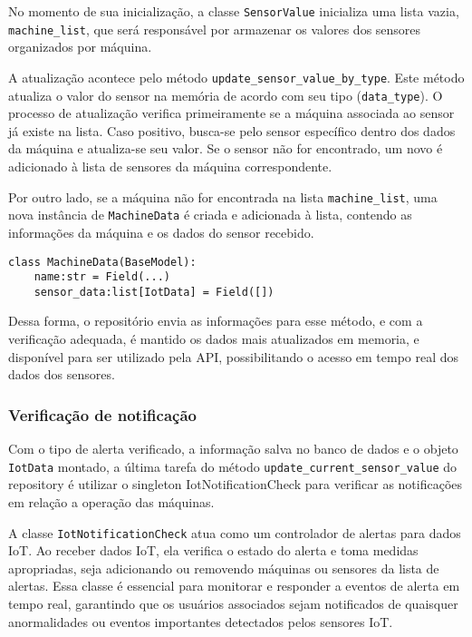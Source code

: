 No momento de sua inicialização, a classe \texttt{SensorValue} inicializa uma lista vazia, \texttt{machine\_list}, que será responsável por armazenar os valores dos sensores organizados por máquina.

A atualização acontece pelo método \texttt{update\_sensor\_value\_by\_type}. Este método atualiza o valor do sensor na memória de acordo com seu tipo (\texttt{data\_type}). O processo de atualização verifica primeiramente se a máquina associada ao sensor já existe na lista. Caso positivo, busca-se pelo sensor específico dentro dos dados da máquina e atualiza-se seu valor. Se o sensor não for encontrado, um novo é adicionado à lista de sensores da máquina correspondente.

Por outro lado, se a máquina não for encontrada na lista \texttt{machine\_list}, uma nova instância de \texttt{MachineData} é criada e adicionada à lista, contendo as informações da máquina e os dados do sensor recebido.

\begin{verbatim}
class MachineData(BaseModel):
    name:str = Field(...)
    sensor_data:list[IotData] = Field([])
\end{verbatim}

Dessa forma, o repositório envia as informações para esse método, e com a verificação adequada, é mantido os dados mais atualizados em memoria, e disponível para ser utilizado pela API, possibilitando o acesso em tempo real dos dados dos sensores.


\subsubsection{Verificação de notificação}
Com o tipo de alerta verificado, a informação salva no banco de dados e o objeto \texttt{IotData} montado, a última tarefa do método \texttt{update\_current\_sensor\_value} do repository é utilizar o singleton IotNotificationCheck para verificar as notificações em relação a operação das máquinas.

A classe \texttt{IotNotificationCheck} atua como um controlador de alertas para dados IoT. Ao receber dados IoT, ela verifica o estado do alerta e toma medidas apropriadas, seja adicionando ou removendo máquinas ou sensores da lista de alertas. Essa classe é essencial para monitorar e responder a eventos de alerta em tempo real, garantindo que os usuários associados sejam notificados de quaisquer anormalidades ou eventos importantes detectados pelos sensores IoT.

